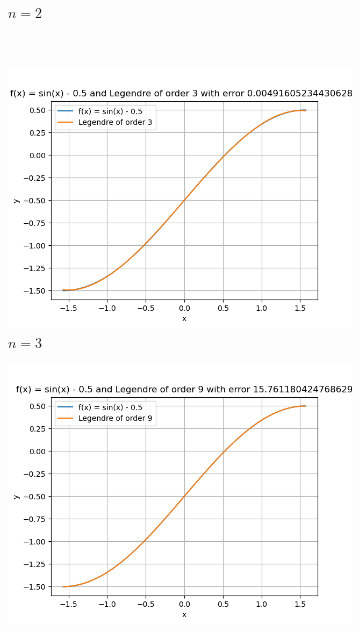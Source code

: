 \documentclass[conference,onecolumn]{IEEEtran}
\begin{document}
\begin{enumerate}[label=\arabic{enumi}.]
\begin{enumerate}
\begin{figure}[H]
\begin{subfigure}{0.49\linewidth}
                                    \caption{$n = 2$}
                              \end{subfigure} \\
                              \begin{subfigure}{0.49\linewidth}
                                    \centering
                                    \includegraphics[width=\linewidth]{figs/Q1_d_poly_3.png}
                                    \caption{$n = 3$}
                              \end{subfigure}
                              \begin{subfigure}{0.49\linewidth}
                                    \centering
                                    \includegraphics[width=\linewidth]{figs/Q1_d_poly_9.png}

\end{subfigure}
\end{figure}
\end{enumerate}
\end{enumerate}
\end{document}
